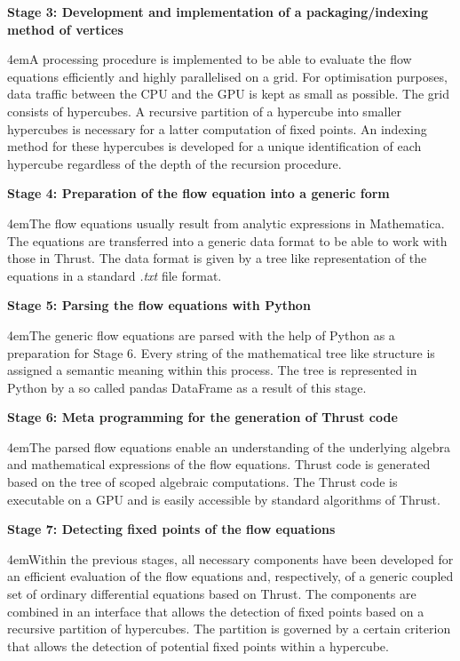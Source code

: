 \documentclass[paper=a4,11pt,bibliography=totoc]{scrartcl}
\begin{document}
\textbf{Stage 3: Development and implementation of a packaging/indexing method of vertices}
\begin{center}
	\leftskip4em\small A processing procedure is implemented to be able to evaluate the flow equations efficiently and highly parallelised on a grid. For optimisation purposes, data traffic between the CPU and the GPU is kept as small as possible. The grid consists of hypercubes. A recursive partition of a hypercube into smaller hypercubes is necessary for a latter computation of fixed points. An indexing method for these hypercubes is developed for a unique identification of each hypercube regardless of the depth of the recursion procedure.
\end{center}

\textbf{Stage 4: Preparation of the flow equation into a generic form}
\begin{center}
	\leftskip4em\small The flow equations usually result from analytic expressions in Mathematica. The equations are transferred into a generic data format to be able to work with those in Thrust. The data format is given by a tree like representation of the equations in a standard \textit{.txt} file format.
\end{center}

\textbf{Stage 5: Parsing the flow equations with Python}
\begin{center}
	\leftskip4em\small The generic flow equations are parsed with the help of Python as a preparation for Stage 6. Every string of the mathematical tree like structure is assigned a semantic meaning within this process. The tree is represented in Python by a so called pandas DataFrame as a result of this stage.
\end{center}

\textbf{Stage 6: Meta programming for the generation of Thrust code}
\begin{center}
	\leftskip4em\small The parsed flow equations enable an understanding of the underlying algebra and mathematical expressions of the flow equations. Thrust code is generated based on the tree of scoped algebraic computations. The Thrust code is executable on a GPU and is easily accessible by standard algorithms of Thrust.
\end{center}

\textbf{Stage 7: Detecting fixed points of the flow equations}
\begin{center}
	\leftskip4em\small Within the previous stages, all necessary components have been developed for an efficient evaluation of the flow equations and, respectively, of a generic coupled set of ordinary differential equations based on Thrust. The components are combined in an interface that allows the detection of fixed points based on a recursive partition of hypercubes. The partition is governed by a certain criterion that allows the detection of potential fixed points within a hypercube.
\end{center}
\end{document}
